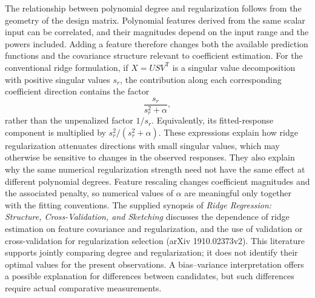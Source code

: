 \documentclass[11pt]{article}
\begin{document}
The relationship between polynomial degree and regularization follows from the geometry of the design matrix. Polynomial features derived from the same scalar input can be correlated, and their magnitudes depend on the input range and the powers included. Adding a feature therefore changes both the available prediction functions and the covariance structure relevant to coefficient estimation. For the conventional ridge formulation, if \(X=USV^{\mathsf T}\) is a singular value decomposition with positive singular values \(s_r\), the contribution along each corresponding coefficient direction contains the factor
\[
\frac{s_r}{s_r^2+\alpha},
\]
rather than the unpenalized factor \(1/s_r\). Equivalently, its fitted-response component is multiplied by \(s_r^2/(s_r^2+\alpha)\). These expressions explain how ridge regularization attenuates directions with small singular values, which may otherwise be sensitive to changes in the observed responses. They also explain why the same numerical regularization strength need not have the same effect at different polynomial degrees. Feature rescaling changes coefficient magnitudes and the associated penalty, so numerical values of \(\alpha\) are meaningful only together with the fitting conventions. The supplied synopsis of \textit{Ridge Regression: Structure, Cross-Validation, and Sketching} discusses the dependence of ridge estimation on feature covariance and regularization, and the use of validation or cross-validation for regularization selection (arXiv 1910.02373v2). This literature supports jointly comparing degree and regularization; it does not identify their optimal values for the present observations. A bias--variance interpretation offers a possible explanation for differences between candidates, but such differences require actual comparative measurements.
\end{document}
